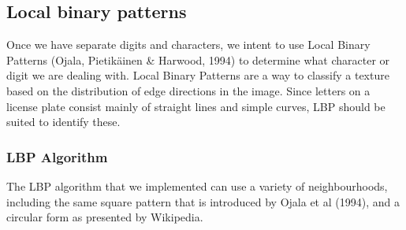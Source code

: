 \documentclass[a4paper]{article}
\begin{document}
\subsection{Local binary patterns}
Once we have separate digits and characters, we intent to use Local Binary
Patterns (Ojala, Pietikäinen \& Harwood, 1994) to determine what character
or digit we are dealing with. Local Binary
Patterns are a way to classify a texture based on the distribution of edge
directions in the image. Since letters on a license plate consist mainly of
straight lines and simple curves, LBP should be suited to identify these.

\subsubsection{LBP Algorithm}
The LBP algorithm that we implemented can use a variety of neighbourhoods,
including the same square pattern that is introduced by Ojala et al (1994),
and a circular form as presented by Wikipedia.
\end{document}

